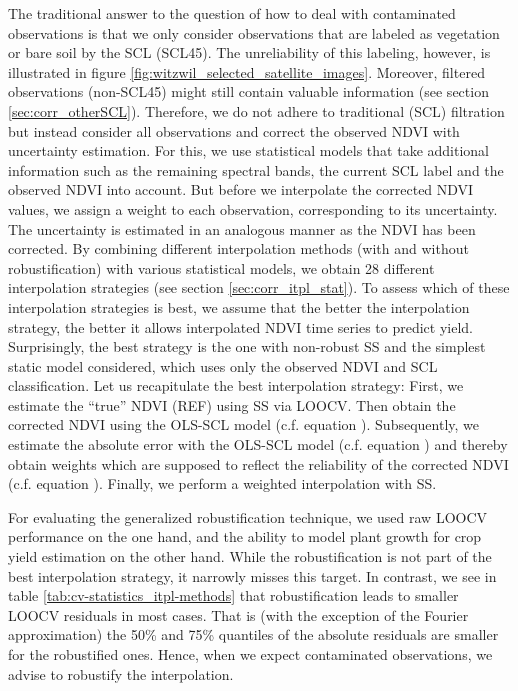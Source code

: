 The traditional answer to the question of how to deal with contaminated observations is that we only consider observations that are labeled as vegetation or bare soil by the SCL (SCL45). The unreliability of this labeling, however, is illustrated in figure \ref{fig:witzwil_selected_satellite_images}. Moreover, filtered observations (non-SCL45) might still contain valuable information (see section \ref{sec:corr_otherSCL}). Therefore, we do not adhere to traditional (SCL) filtration but instead consider all observations and correct the observed NDVI with uncertainty estimation. For this, we use statistical models that take additional information such as the remaining spectral bands, the current SCL label and the observed NDVI into account. But before we interpolate the corrected NDVI values, we assign a weight to each observation, corresponding to its uncertainty. The uncertainty is estimated in an analogous manner as the NDVI has been corrected. 
    By combining different interpolation methods (with and without robustification) with various statistical models, we obtain 28 different interpolation strategies (see section \ref{sec:corr_itpl_stat}). To assess which of these interpolation strategies is best, we assume that the better the interpolation strategy, the better it allows interpolated NDVI time series to predict yield. Surprisingly, the best strategy is the one with non-robust SS and the simplest static model considered, which uses only the observed NDVI and SCL classification.
Let us recapitulate the best interpolation strategy: First, we estimate the ``true'' NDVI (REF) using SS via LOOCV. Then obtain the corrected NDVI using the OLS-SCL model (c.f. equation ). Subsequently, we estimate the absolute error with the OLS-SCL model (c.f. equation ) and thereby obtain weights which are supposed to reflect the reliability of the corrected NDVI (c.f. equation ). Finally, we perform a weighted interpolation with SS.

For evaluating the generalized robustification technique, we used raw LOOCV performance on the one hand, and the ability to model plant growth for crop yield estimation on the other hand.
While the robustification is not part of the best interpolation strategy, it narrowly misses this target. In contrast, we see in table \ref{tab:cv-statistics_itpl-methods} that robustification leads to smaller LOOCV residuals in most cases. That is (with the exception of the Fourier approximation) the 50\% and 75\% quantiles of the absolute residuals are smaller for the robustified ones. Hence, when we expect contaminated observations, we advise to robustify the interpolation. 

